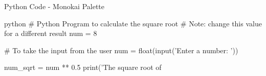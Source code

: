 \documentclass[aspectratio=169]{beamer} %
\begin{document}
\begin{SliTC}{Python Code - Monokai Palette}
    \begin{CodeD}{python}
# Python Program to calculate the square root
# Note: change this value for a different result
num = 8 

# To take the input from the user
num = float(input('Enter a number: '))

num_sqrt = num ** 0.5
print('The square root of %
    \end{CodeD}
\end{SliTC}


\end{document}
